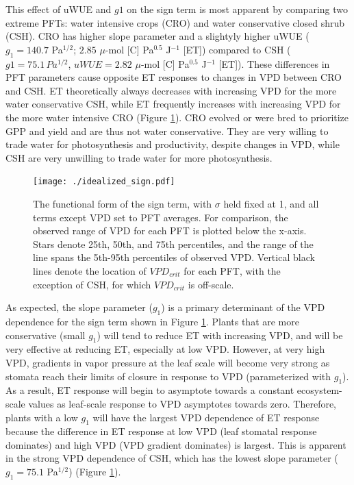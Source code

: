 \documentclass[draft,linenumbers]{agujournal}
\begin{document}
This effect of uWUE and $g1$ on the sign term is most apparent by
comparing two extreme PFTs: water intensive crops (CRO) and water
conservative closed shrub (CSH). CRO has higher slope parameter and a
slightyly higher uWUE ($g_1 = 140.7$ Pa$^{1/2}$; $2.85$ $\mu$-mol [C]
Pa$^{0.5}$ J$^{-1}$ [ET]) compared to CSH ($g1 = 75.1 \, Pa^{1/2}$,
$uWUE=2.82$ $\mu$-mol [C] Pa$^{0.5}$ J$^{-1}$ [ET]). These differences
in PFT parameters cause opposite ET responses to changes in VPD
between CRO and CSH. ET theoretically always decreases with increasing
VPD for the more water conservative CSH, while ET frequently increases
with increasing VPD for the more water intensive CRO (Figure
\ref{idealized_sign}). CRO evolved or were bred to prioritize GPP and
yield and are thus not water conservative. They are very willing to
trade water for photosynthesis and productivity, despite changes in
VPD, while CSH are very unwilling to trade water for more
photosynthesis.

\begin{figure}
  \centering \texttt{[image: ./idealized\_sign.pdf]}
  \caption{The functional form of the sign term, with $\sigma$ held
    fixed at 1, and all terms except VPD set to PFT averages. For
    comparison, the observed range of VPD for each PFT is plotted
    below the x-axis. Stars denote 25th, 50th, and 75th percentiles,
    and the range of the line spans the 5th-95th percentiles of
    observed VPD. Vertical black lines denote the location of
    $VPD_{crit}$ for each PFT, with the exception of CSH, for which
    $VPD_{crit}$ is off-scale.}
  \label{idealized_sign}
\end{figure}


As expected, the slope parameter ($g_1$) is a primary determinant of
the VPD dependence for the sign term shown in Figure
\ref{idealized_sign}. Plants that are more conservative (small $g_1$)
will tend to reduce ET with increasing VPD, and will be very effective
at reducing ET, especially at low VPD. However, at very high VPD,
gradients in vapor pressure at the leaf scale will become very strong
as stomata reach their limits of closure in response to VPD
(parameterized with $g_1$). As a result, ET response will begin to
asymptote towards a constant ecosystem-scale values as leaf-scale
response to VPD asymptotes towards zero.  Therefore, plants with a low
$g_1$ will have the largest VPD dependence of ET response because the
difference in ET response at low VPD (leaf stomatal response
dominates) and high VPD (VPD gradient dominates) is largest. This is
apparent in the strong VPD dependence of CSH, which has the lowest
slope parameter ($g_1=75.1$ Pa$^{1/2}$) (Figure \ref{idealized_sign}).
\end{document}
